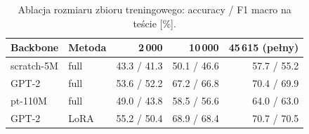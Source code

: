 \begin{table}[H]
\centering
\small
\caption{Ablacja rozmiaru zbioru treningowego: accuracy / F1 macro na teście [\%].}
\label{tab:ablation}
\begin{tabular}{@{}llrrr@{}}
\toprule
Backbone & Metoda & 2\,000 & 10\,000 & 45\,615 (pełny) \\
\midrule
scratch-5M & full & 43.3 / 41.3 & 50.1 / 46.6 & 57.7 / 55.2 \\
GPT-2 & full & 53.6 / 52.2 & 67.2 / 66.8 & 70.4 / 69.9 \\
pt-110M & full & 49.0 / 43.8 & 58.5 / 56.6 & 64.0 / 63.0 \\
GPT-2 & LoRA & 55.2 / 50.4 & 68.9 / 68.4 & 70.7 / 70.5 \\
\bottomrule
\end{tabular}
\end{table}
